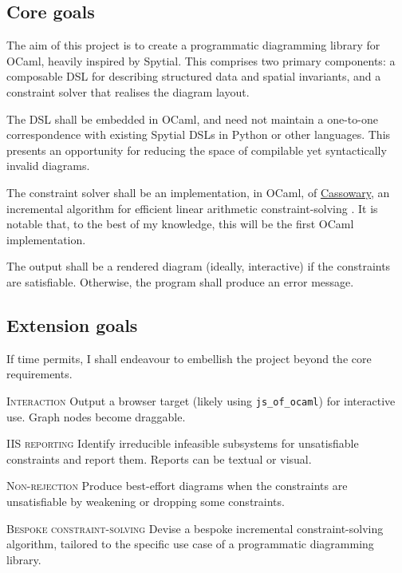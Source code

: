 \documentclass[a4paper, 12pt]{article}
\begin{document}
\subsection{Core goals}

The aim of this project is to create a programmatic diagramming library for OCaml, heavily inspired by Spytial. This comprises two primary components: a composable DSL for describing structured data and spatial invariants, and a constraint solver that realises the diagram layout.

The DSL shall be embedded in OCaml, and need not maintain a one-to-one correspondence with existing Spytial DSLs in Python or other languages. This presents an opportunity for reducing the space of compilable yet syntactically invalid diagrams.

The constraint solver shall be an implementation, in OCaml, of \href{https://constraints.cs.washington.edu/cassowary/}{Cassowary}, an incremental algorithm for efficient linear arithmetic constraint-solving \cite{cassowaryIntro}. It is notable that, to the best of my knowledge, this will be the first OCaml implementation.

The output shall be a rendered diagram (ideally, interactive) if the constraints are satisfiable. Otherwise, the program shall produce an error message.

\subsection{Extension goals}

If time permits, I shall endeavour to embellish the project beyond the core requirements.

\textsc{Interaction} \hspace{1em} Output a browser target (likely using \texttt{js\_of\_ocaml}) for interactive use. Graph nodes become draggable.

\textsc{IIS reporting} \hspace{1em} Identify irreducible infeasible subsystems for unsatisfiable constraints and report them. Reports can be textual or visual.

\textsc{Non-rejection} \hspace{1em} Produce best-effort diagrams when the constraints are unsatisfiable by weakening or dropping some constraints.

\textsc{Bespoke constraint-solving} \hspace{1em} Devise a bespoke incremental constraint-solving algorithm, tailored to the specific use case of a programmatic diagramming library.
\end{document}
